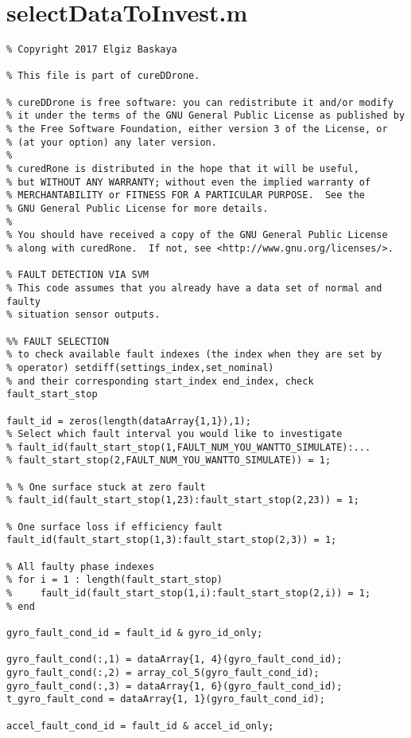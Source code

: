\section{selectDataToInvest.m}
\begin{lstlisting}
% Copyright 2017 Elgiz Baskaya

% This file is part of cureDDrone.

% cureDDrone is free software: you can redistribute it and/or modify
% it under the terms of the GNU General Public License as published by
% the Free Software Foundation, either version 3 of the License, or
% (at your option) any later version.
% 
% curedRone is distributed in the hope that it will be useful,
% but WITHOUT ANY WARRANTY; without even the implied warranty of
% MERCHANTABILITY or FITNESS FOR A PARTICULAR PURPOSE.  See the
% GNU General Public License for more details.
% 
% You should have received a copy of the GNU General Public License
% along with curedRone.  If not, see <http://www.gnu.org/licenses/>.

% FAULT DETECTION VIA SVM
% This code assumes that you already have a data set of normal and faulty 
% situation sensor outputs.

%% FAULT SELECTION
% to check available fault indexes (the index when they are set by
% operator) setdiff(settings_index,set_nominal)
% and their corresponding start_index end_index, check fault_start_stop

fault_id = zeros(length(dataArray{1,1}),1);
% Select which fault interval you would like to investigate
% fault_id(fault_start_stop(1,FAULT_NUM_YOU_WANTTO_SIMULATE):...
% fault_start_stop(2,FAULT_NUM_YOU_WANTTO_SIMULATE)) = 1;

% % One surface stuck at zero fault
% fault_id(fault_start_stop(1,23):fault_start_stop(2,23)) = 1;

% One surface loss if efficiency fault
fault_id(fault_start_stop(1,3):fault_start_stop(2,3)) = 1;

% All faulty phase indexes
% for i = 1 : length(fault_start_stop)
%     fault_id(fault_start_stop(1,i):fault_start_stop(2,i)) = 1;
% end

gyro_fault_cond_id = fault_id & gyro_id_only;

gyro_fault_cond(:,1) = dataArray{1, 4}(gyro_fault_cond_id);
gyro_fault_cond(:,2) = array_col_5(gyro_fault_cond_id);
gyro_fault_cond(:,3) = dataArray{1, 6}(gyro_fault_cond_id);
t_gyro_fault_cond = dataArray{1, 1}(gyro_fault_cond_id);

accel_fault_cond_id = fault_id & accel_id_only;


\end{lstlisting}
